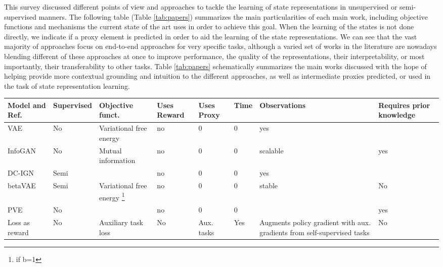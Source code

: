 \documentclass[a4paper]{article}
\begin{document}
This survey discussed different points of view and approaches to tackle the learning of state representations in unsupervised or semi-supervised manners. The following table (Table \ref{tab:papers}) summarizes the main particularities of each main work, including objective functions and mechanisms the current state of the art uses in order to achieve this goal. When the learning of the states is not done directly, we indicate if a proxy element is predicted in order to aid the learning of the state representations. We can see that the vast majority of approaches focus on end-to-end approaches for very specific tasks, although a varied set of works in the literature are nowadays blending different of these approaches at once to improve performance, the quality of the representations, their interpretability, or most importantly, their transferability to other tasks. Table \ref{tab:papers} schematically summarizes the main works discussed with the hope of helping provide more contextual grounding and intuition to the different approaches, as well as intermediate proxies predicted, or used in the task of state representation learning.


\begin{sidewaystable}[!htbp]
\centering
\caption{Approaches with proxy tasks used for state representation learning: \textit{Proxy}, \textit{Reward} and \textit{Time} columns indicate if the approach uses rewards (\textit{Rw}), uses time-based observations (\textit{Time}), or a third element proxy (\textit{Proxy}) in order to learn the state (versus learning the state directly such as e.g., VAEs).} 
\label{tab:papers}
\begin{tabular}{p{42mm}|p{20mm}|p{20mm}|p{13mm}|p{10mm}|p{10mm}|p{30mm}|p{20mm}}
\textbf{Model and Ref.} & \textbf{Supervised} & \textbf{Objective funct.} & \textbf{Uses Reward} & \textbf{Uses Proxy} & \textbf{Time}  & \textbf{Observations} & \textbf{Requires prior knowledge} \\\hline\hline

VAE \cite{Kingma13} & No & Variational free energy & no  & 0 & 0 & yes  & \\\hline
InfoGAN \cite{Chen16}   & No & Mutual information & no  & 0  & 0 & scalable & yes \\\hline
DC-IGN \cite{Kulkarni15}  & Semi &  & no      & 0  & 0   & yes & \\\hline
betaVAE \cite{Higgins16}   & Semi & Variational free energy \footnote{\cite{Jordan99} if b=1} & no & 0  & 0 & stable   & No  \\\hline
PVE \cite{Jonschkowski17} & No & & no & 0 & 0 &  & yes  \\\hline      
Loss as reward \cite{Shelhamer17}  & No & Auxiliary task loss & No & Aux. tasks & Yes & Augments policy gradient with aux. gradients from self-supervised tasks & No \\\hline 
\end{tabular}
\end{sidewaystable}
\end{document}
